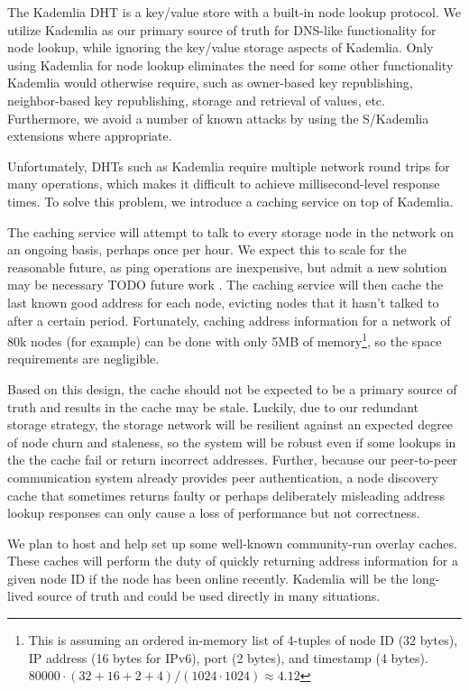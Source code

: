 \documentclass[11pt,fleqn,openany]{book}
\newcommand{\todo}[1]{{\color{red} TODO #1 }}
\begin{document}
The Kademlia DHT is a key/value store with a built-in node lookup protocol.
We utilize Kademlia as our primary source of truth for DNS-like
functionality for node lookup, while ignoring the key/value storage aspects of
Kademlia.
Only using Kademlia for node lookup eliminates the need for some other
functionality Kademlia would otherwise require, such as owner-based key
republishing, neighbor-based key republishing, storage and retrieval of values,
etc. Furthermore, we avoid a number of known attacks by using the
S/Kademlia \cite{skad} extensions where appropriate.

Unfortunately, DHTs such as Kademlia require multiple network round trips for
many operations, which makes it difficult to achieve millisecond-level
response times. To solve this problem, we introduce a caching service on top
of Kademlia.

The caching service will attempt to talk to every storage node in the network
on an ongoing basis, perhaps once per hour. We expect this to scale for the
reasonable future, as ping operations are inexpensive, but admit a new solution
may be necessary \todo{future work}. The caching service will then cache
the last known good address for each node, evicting nodes that it hasn't talked
to after a certain period.
Fortunately, caching address information for a network of 80k nodes
(for example) can be done with only 5MB of memory\footnote{
This is assuming an ordered in-memory list of 4-tuples of node ID (32 bytes),
IP address (16 bytes for IPv6), port (2 bytes), and timestamp (4 bytes).
$80000\cdot(32+16+2+4)/(1024\cdot 1024) \approx 4.12$
}, so the space requirements
are negligible.

Based on this design, the cache should not be expected to be a primary source
of truth and results in the cache may be stale. Luckily, due to our redundant
storage strategy, the storage network will be resilient against an expected
degree of node churn and staleness,
so the system will be robust even if some lookups in the the cache
fail or return incorrect addresses.
Further, because our peer-to-peer communication
system already provides peer authentication, a node discovery cache that
sometimes returns faulty
or perhaps deliberately misleading address lookup responses can only cause a
loss of performance but not correctness.

We plan to host and help set up some well-known community-run overlay caches.
These caches will perform the duty of quickly returning address information
for a given node ID if the node has been online recently. Kademlia will be the
long-lived source of truth and could be used directly in many situations.
\end{document}
